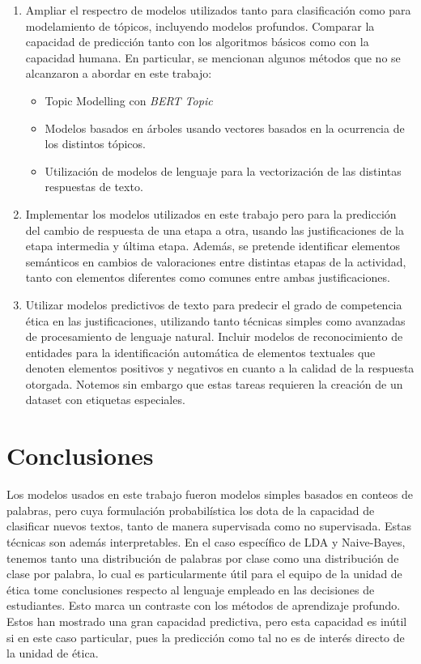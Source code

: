 \documentclass[
	spanish, %
	letterpaper, oneside
]{article}
\begin{document}
\begin{enumerate}
    \item Ampliar el respectro de modelos utilizados tanto para clasificación como para modelamiento de tópicos, incluyendo modelos profundos. Comparar la capacidad de predicción tanto con los algoritmos básicos como con la capacidad humana. En particular, se mencionan algunos métodos que no se alcanzaron a abordar en este trabajo:
    \begin{itemize}
        \item Topic Modelling con \textit{BERT Topic}
        \item Modelos basados en árboles usando vectores basados en la ocurrencia de los distintos tópicos.
        \item Utilización de modelos de lenguaje para la vectorización de las distintas respuestas de texto.
    \end{itemize}
    \item Implementar los modelos utilizados en este trabajo pero para la predicción del cambio de respuesta de una etapa a otra, usando las justificaciones de la etapa intermedia y última etapa. Además, se pretende identificar elementos semánticos en cambios de valoraciones entre distintas etapas de la actividad, tanto con elementos diferentes como comunes entre ambas justificaciones.
    \item Utilizar modelos predictivos de texto para predecir el grado de competencia ética en las justificaciones, utilizando tanto técnicas simples como avanzadas de procesamiento de lenguaje natural. Incluir modelos de reconocimiento de entidades para la identificación automática de elementos textuales que denoten elementos positivos y negativos en cuanto a la calidad de la respuesta otorgada. Notemos sin embargo que estas tareas requieren la creación de un dataset con etiquetas especiales.

\end{enumerate}


\section{Conclusiones}

Los modelos usados en este trabajo fueron modelos simples basados en conteos de palabras, pero cuya formulación probabilística los dota de la capacidad de clasificar nuevos textos, tanto de manera supervisada como no supervisada.  Estas técnicas son además interpretables. En el caso específico de LDA y Naive-Bayes, tenemos tanto una distribución de palabras por clase como una distribución de clase por palabra, lo cual es particularmente útil para el equipo de la unidad de ética tome conclusiones respecto al lenguaje empleado en las decisiones de estudiantes. Esto marca un contraste con los métodos de aprendizaje profundo. Estos han mostrado una gran capacidad predictiva, pero esta capacidad es inútil si en este caso particular, pues la predicción como tal no es de interés directo de la unidad de ética.
\end{document}
